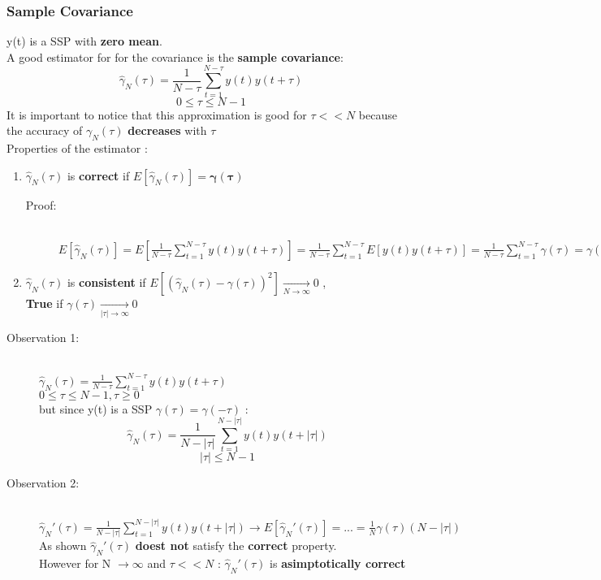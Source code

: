 \subsubsection{Sample Covariance}
y(t) is a SSP with \textbf{zero mean}.\\
A good estimator for for the covariance is the \textbf{sample covariance}:
$$ \hat{\gamma}_N(\tau)	= \frac{1}{N-\tau} \sum\limits_{t=1}^{N-\tau}y(t)y(t+\tau)$$ $$ 0 \leq \tau \leq N-1$$
It is important to notice that this approximation is good for $ \tau << N $ because the accuracy of $ \gamma_N(\tau) $ \textbf{decreases} with $ \tau $ \\
Properties of the estimator :
\begin{enumerate}
\item $ \hat{\gamma}_N(\tau)$ is \textbf{correct} if $ E[ \hat{\gamma}_N(\tau)] = \mathbf{\gamma(\tau) }$ 
\begin{description}
\item[Proof:]\hfill\\
$ E[ \hat{\gamma}_N(\tau)] = E[ \frac{1}{N-\tau} \sum\limits_{t=1}^{N-\tau}y(t)y(t+\tau)]  = \frac{1}{N-\tau} \sum\limits_{t=1}^{N-\tau} E[y(t)y(t+\tau)] = \frac{1}{N-\tau} \sum\limits_{t=1}^{N-\tau} \gamma(\tau) = \gamma(\tau) $
\end{description}
\item $\hat{\gamma}_N(\tau)$ is \textbf{consistent} if $ E[(\hat{\gamma}_N(\tau)-\gamma(\tau))^2] \xrightarrow[N \to \infty] {} 0 $ , \\ \textbf{True } if $ \gamma(\tau) \xrightarrow[|\tau| \to \infty]{} 0$
\end{enumerate}
\begin{description}
\item[Observation 1:]\hfill\\
$ \hat{\gamma}_N(\tau)	= \frac{1}{N-\tau} \sum\limits_{t=1}^{N-\tau}y(t)y(t+\tau) $ \\ $ 0 \leq \tau \leq N-1 , \tau \geq 0$ \\ but since y(t) is a SSP $ \gamma(\tau) = \gamma(-\tau) $ : $$ \hat{\gamma}_N(\tau)	= \frac{1}{N-|\tau|} \sum\limits_{t=1}^{N-|\tau|}y(t)y(t+|\tau|) $$ $$ |\tau| \leq N-1 $$ 
\newpage
\item[Observation 2:]\hfill\\
$ \hat{\gamma}_{N}'(\tau)	= \frac{1}{N-|\tau|} \sum\limits_{t=1}^{N-|\tau|}y(t)y(t+|\tau|) \to E[ \hat{\gamma}_{N}'(\tau)] = ... = \frac{1}{N} \gamma(\tau)(N-|\tau|) $\\As shown $ \hat{\gamma}_{N}'(\tau)$  \textbf{doest not} satisfy the \textbf{correct} property.\\However for N $\to \infty $ and $ \tau << N $ :  $ \hat{\gamma}_{N}'(\tau)$ is \textbf{asimptotically correct}
\end{description}
